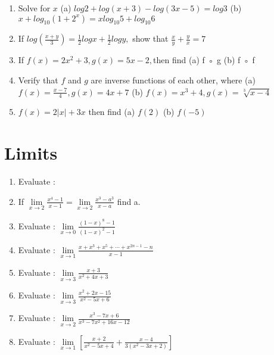 \documentclass[14pt]{article}
\begin{document}
\begin{multicols}{2}
\begin{enumerate}[resume]
\item Solve for $x$ (a) $log2 + log(x+3) - log(3x-5) = log3$ (b) $x + log_{10} (1+2^x ) = x log_{10} 5 + log_{ 10}6$

\item If  $log\left(\frac{x+y}{3}\right)=\frac{1}{2}log x+ \frac{1}{2}log y, $ show that $\frac{x}{y}+\frac{y}{x}=7$


\item If  $f (x) = 2x^2 + 3, g (x) = 5x - 2, $then find
	(a) f ◦ g
	(b) f ◦ f	

\item Verify that $ f $  and  $ g $ are inverse functions of each other, where (a) $ f(x) = \frac { x - 7 }{4}, g(x) = 4x + 7 $ (b) $ f(x) = x^3 + 4, g(x) = \sqrt[3]{x - 4 } $

\item $ f(x) = 2 \left| x \right| + 3x $ then find (a) $ f(2)$ (b) $ f(-5) $

\end{enumerate} 

\section{Limits}
\noindent
\begin{enumerate}[resume]
\item Evaluate : 
 
\item If $ \lim\limits_{x \to 2} \frac{ x^4 - 1}{ x - 1} = \lim\limits_{x \to 2} \frac{ x^3 - a^3}{x-a} $ find a.

\item Evaluate : $ \lim\limits_{x \to 0} \frac{ (1- x)^8 - 1}{(1- x)^2 - 1} $ 

 \item Evaluate : $ \lim\limits_{ x \to 1 } \frac{ x + x^3 + x^5 +\cdots +x^{2n - 1} - n }{x-1} $
 
 \item Evaluate : $ \lim\limits_{x \to 3} \frac{ x + 3}{ x^2 +4x + 3 } $
 
\item Evaluate : $ \lim\limits_{x \to 3} \frac{ x^2 + 2x - 15}{ x^2 - 5x + 6 } $

\item Evaluate : $ \lim\limits_{x \to 2} \frac{ x^3 - 7x + 6}{ x^3 - 7x^2 + 16x - 12   } $

\item Evaluate : $ \lim\limits_{ x \to 1 } \left[ \frac{ x + 2 }{x^2-5x + 4} + \frac{ x - 4 }{3(x^2-3x+2)} \right] $


\end{enumerate}
\end{multicols}
\end{document}
